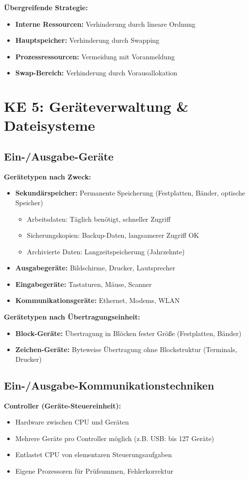 \documentclass[9pt,a4paper]{extarticle}
\begin{document}
\begin{multicols*}{2}
\textbf{Übergreifende Strategie:}
\begin{itemize}
\item \textbf{Interne Ressourcen:} Verhinderung durch lineare Ordnung
\item \textbf{Hauptspeicher:} Verhinderung durch Swapping
\item \textbf{Prozessressourcen:} Vermeidung mit Voranmeldung
\item \textbf{Swap-Bereich:} Verhinderung durch Vorausallokation
\end{itemize}

\section{KE 5: Geräteverwaltung \& Dateisysteme}

\subsection{Ein-/Ausgabe-Geräte}
\textbf{Gerätetypen nach Zweck:}
\begin{itemize}
\item \textbf{Sekundärspeicher:} Permanente Speicherung (Festplatten, Bänder, optische Speicher)
  \begin{itemize}
  \item Arbeitsdaten: Täglich benötigt, schneller Zugriff
  \item Sicherungskopien: Backup-Daten, langsamerer Zugriff OK
  \item Archivierte Daten: Langzeitspeicherung (Jahrzehnte)
  \end{itemize}
\item \textbf{Ausgabegeräte:} Bildschirme, Drucker, Lautsprecher
\item \textbf{Eingabegeräte:} Tastaturen, Mäuse, Scanner
\item \textbf{Kommunikationsgeräte:} Ethernet, Modems, WLAN
\end{itemize}

\textbf{Gerätetypen nach Übertragungseinheit:}
\begin{itemize}
\item \textbf{Block-Geräte:} Übertragung in Blöcken fester Größe (Festplatten, Bänder)
\item \textbf{Zeichen-Geräte:} Byteweise Übertragung ohne Blockstruktur (Terminals, Drucker)
\end{itemize}

\subsection{Ein-/Ausgabe-Kommunikationstechniken}
\textbf{Controller (Geräte-Steuereinheit):}
\begin{itemize}
\item Hardware zwischen CPU und Geräten
\item Mehrere Geräte pro Controller möglich (z.B. USB: bis 127 Geräte)
\item Entlastet CPU von elementaren Steuerungsaufgaben
\item Eigene Prozessoren für Prüfsummen, Fehlerkorrektur
\end{itemize}


\end{multicols*}
\end{document}
